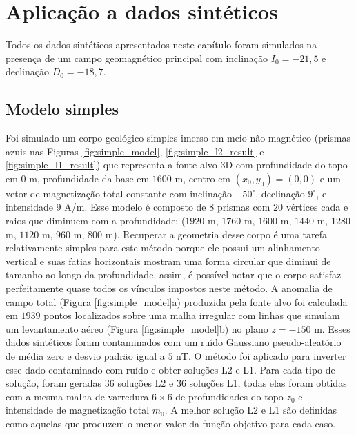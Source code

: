 \chapter{Aplicação a dados sintéticos}

Todos os dados sintéticos apresentados neste capítulo foram simulados na presença de um campo geomagnético principal com inclinação $ I_0 = -21,5 $ e declinação $ D_0 = -18,7 $.


\section{Modelo simples}

Foi simulado um corpo geológico simples imerso em meio não magnético (prismas azuis nas Figuras 
\ref{fig:simple_model}, \ref{fig:simple_l2_result} e \ref{fig:simple_l1_result})
que representa a fonte alvo 3D com profundidade do topo em $0$ m, profundidade da base em $1600$ m, centro em $ (x_0, y_0) = (0, 0) $ e um vetor de magnetização total constante com inclinação $-50^{\circ}$, declinação $9^{\circ}$, e intensidade $9$ A/m.
Esse modelo é composto de $ 8 $ prismas com $ 20 $ vértices cada e raios que diminuem com a profundidade: ($ 1920 $ m, $ 1760 $ m, $ 1600 $ m, $ 1440 $ m, $ 1280 $ m, $ 1120 $ m, $ 960 $ m, $ 800 $ m).
Recuperar a geometria desse corpo é uma tarefa relativamente simples para este método porque ele possui um alinhamento vertical e suas fatias horizontais mostram uma forma circular que diminui de tamanho ao longo da profundidade, assim, é possível notar que o corpo satisfaz perfeitamente quase todos os vínculos impostos neste método.
A anomalia de campo total (Figura \ref{fig:simple_model}a) produzida pela fonte alvo foi calculada em $1939$ pontos localizados sobre uma malha irregular com linhas que simulam um levantamento aéreo (Figura \ref{fig:simple_model}b) no plano $ z=-150 $ m. Esses dados sintéticos foram contaminados com um ruído Gaussiano pseudo-aleatório de média zero e desvio padrão igual a $5$ nT.
O método foi aplicado para inverter esse dado contaminado com ruído e obter soluções L2 e L1.
Para cada tipo de solução, foram geradas $36$ soluções L2 e $36$ soluções L1, 
todas elas foram obtidas com a mesma malha de varredura $6 \times 6$ de profundidades do topo $z_{0}$ e intensidade de magnetização total $m_{0}$.
A melhor solução L2 e L1 são definidas como aquelas que produzem o menor valor da função objetivo para cada caso.

